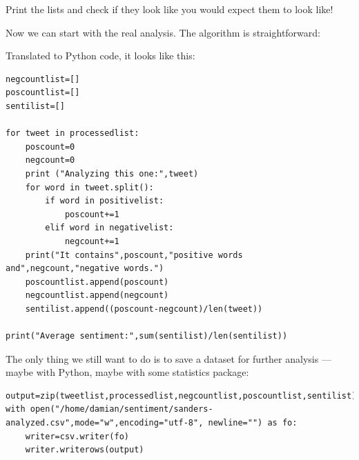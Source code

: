 \documentclass[a4paper,12pt]{book}
\newcounter{lijst}
\renewcommand{\texttt}[1]{%
  \begingroup
  \ttfamily
  \begingroup\lccode`~=`/\lowercase{\endgroup\def~}{/\discretionary{}{}{}}%
  \begingroup\lccode`~=`[\lowercase{\endgroup\def~}{[\discretionary{}{}{}}%
  \begingroup\lccode`~=`.\lowercase{\endgroup\def~}{.\discretionary{}{}{}}%
  \begingroup\lccode`~=`(\lowercase{\endgroup\def~}{(\discretionary{}{}{}}%
  \catcode`/=\active\catcode`[=\active\catcode`.=\active\catcode`(=\active
  \scantokens{#1\noexpand}%
  \endgroup
}
\begin{document}
Print the lists and check if they look like you would expect them to look like!

Now we can start with the real analysis. The algorithm is straightforward:

Translated to Python code, it looks like this:

\begin{lstlisting}
negcountlist=[]
poscountlist=[]
sentilist=[]

for tweet in processedlist:
    poscount=0
    negcount=0
    print ("Analyzing this one:",tweet)
    for word in tweet.split():
        if word in positivelist:
            poscount+=1
        elif word in negativelist:
            negcount+=1        
    print("It contains",poscount,"positive words and",negcount,"negative words.")
    poscountlist.append(poscount)
    negcountlist.append(negcount)
    sentilist.append((poscount-negcount)/len(tweet))
    
print("Average sentiment:",sum(sentilist)/len(sentilist))
\end{lstlisting}

The only thing we still want to do is to save a dataset for further analysis --- maybe with Python, maybe with some statistics package:

\begin{lstlisting}
output=zip(tweetlist,processedlist,negcountlist,poscountlist,sentilist)
with open("/home/damian/sentiment/sanders-analyzed.csv",mode="w",encoding="utf-8", newline="") as fo:
    writer=csv.writer(fo)
    writer.writerows(output)
\end{lstlisting}
\end{document}
